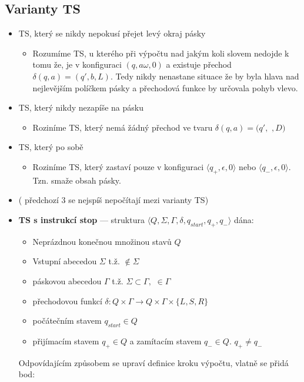 \documentclass[10pt,a4paper]{article}
\theoremstyle{note}
\begin{document}
	\subsection{Varianty TS}
		\begin{itemize}
			\item TS, který se nikdy nepokusí přejet levý okraj pásky
				\begin{itemize}
					\item Rozumíme TS, u kterého při výpočtu nad jakým koli slovem nedojde k tomu že, je v konfiguraci
						$(q,a\omega,0)$ a existuje přechod $\delta(q,a) = (q',b,L).$  Tedy nikdy nenastane situace
						že by byla hlava nad nejlevějším políčkem pásky a přechodová funkce by určovala pohyb 								vlevo.
				\end{itemize}
			\item TS, který nikdy nezapíše na pásku \textvisiblespace
				\begin{itemize}
					\item Roziníme TS, který nemá žádný přechod ve tvaru $\delta(q,a) = (q',$ \textvisiblespace $,D)$
				\end{itemize}
			\item TS, který po sobě 
				\begin{itemize}
					\item Roziníme TS, který zastaví pouze v konfiguraci $\langle q_{+}, \epsilon, 0 \rangle$
						nebo $\langle q_{-}, \epsilon, 0 \rangle$. Tzn. smaže obsah pásky.
				\end{itemize}
			\item ( předchozí 3 se nejspíš nepočítají mezi varianty TS)
			\item \textbf{TS s instrukcí stop} --- struktura  $\langle Q, \Sigma, \Gamma, \delta, q_{start}, q_{+}, q_{-} \rangle $
								dána:
				\begin{itemize}
					\item Neprázdnou konečnou množinou stavů $Q$
					\item Vstupní abecedou  $\Sigma$ t.ž. \textvisiblespace $ \notin \Sigma$
					\item páskovou abecedou $\Gamma$ t.ž. $\Sigma \subset \Gamma,$ \textvisiblespace $\in  \Gamma $
					\item přechodovou funkcí $\delta : Q \times  \Gamma \rightarrow Q \times \Gamma \times \{L, S, R \} $
					\item počátečním stavem $q_{start} \in Q$
					\item přijímacím stavem $q_{+} \in Q $ a zamítacím stavem $q_{-} \in Q.$ $q_{+} \neq q_{-}$
				\end{itemize}
				Odpovídajícím způsobem se upraví definice kroku výpočtu, vlatně se přidá bod:


\end{itemize}
\end{document}
